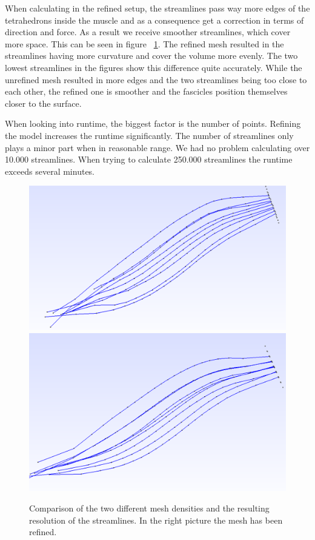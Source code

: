 \documentclass[preprint,journal]{vgtc}       %
\begin{document}
When calculating in the refined setup, the streamlines pass way more edges of the tetrahedrons inside the muscle and as a consequence get a correction in terms of direction and force. 
As a result we receive smoother streamlines, which cover more space. 
This can be seen in figure ~\ref{fig:refStreamlines}.
The refined mesh resulted in the streamlines having more curvature and cover the volume more evenly.
The two lowest streamlines in the figures show this difference quite accurately.
While the unrefined mesh resulted in more edges and the two streamlines being too close to each other, the refined one is smoother and the fascicles position themselves closer to the surface.

When looking into runtime, the biggest factor is the number of points.
Refining the model increases the runtime significantly. 
The number of streamlines only plays a minor part when in reasonable range.
We had no problem calculating over 10.000 streamlines. When trying to calculate 250.000 streamlines the runtime exceeds several minutes.

\begin{figure}
	\begin{minipage}{\linewidth}
		\includegraphics[width=.5\linewidth]{Streamlines.PNG}
		\includegraphics[width=.51\linewidth]{refStreamlines.PNG}
		\caption{Comparison of the two different mesh densities and the resulting resolution of the streamlines. In the right picture the mesh has been refined.}
		\label{fig:refStreamlines}
	\end{minipage}
\end{figure}
\end{document}
